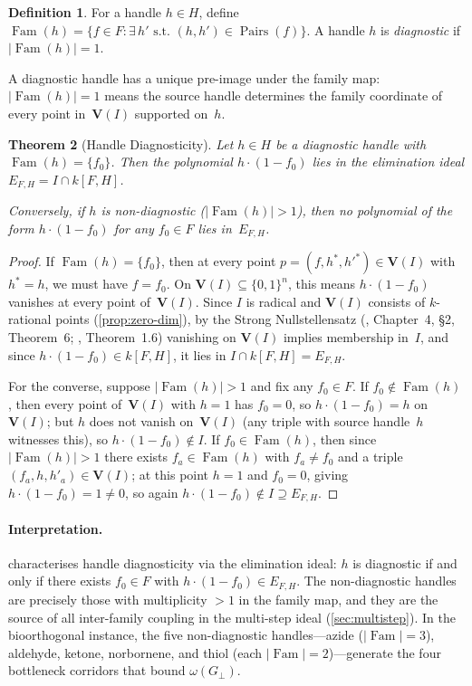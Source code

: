 \documentclass[preprint,12pt]{elsarticle}
\newtheorem{theorem}{Theorem}[section]
\theoremstyle{definition}
\newtheorem{definition}[theorem]{Definition}
\theoremstyle{remark}
\newcommand{\kk}{k}
\newcommand{\Var}{\mathbf{V}}
\DeclareMathOperator{\Fam}{Fam}
\DeclareMathOperator{\Pairs}{Pairs}
\begin{document}
\begin{definition}\label{def:diagnostic}
For a handle $h \in H$, define
$\Fam(h) = \{f \in F : \exists\, h' \text{ s.t.\ }
(h, h') \in \Pairs(f)\}$.
A handle $h$ is \emph{diagnostic} if $|\Fam(h)| = 1$.
\end{definition}

A diagnostic handle has a unique pre-image under the family
map: $|\Fam(h)| = 1$ means the source handle determines the
family coordinate of every point in~$\Var(I)$ supported on~$h$.

\begin{theorem}[Handle Diagnosticity]\label{thm:diagnostic}
Let $h \in H$ be a diagnostic handle with $\Fam(h) = \{f_0\}$.
Then the polynomial $h \cdot (1 - f_0)$ lies in the elimination
ideal $E_{F,H} = I \cap \kk[F, H]$.

Conversely, if $h$ is non-diagnostic ($|\Fam(h)| > 1$), then
no polynomial of the form $h \cdot (1 - f_0)$ for any $f_0 \in F$
lies in~$E_{F,H}$.
\end{theorem}

\begin{proof}
If $\Fam(h) = \{f_0\}$, then at every point
$p = (f, h^*, h'^*) \in \Var(I)$ with $h^* = h$, we must have
$f = f_0$.  On $\Var(I) \subseteq \{0,1\}^n$, this means
$h \cdot (1 - f_0)$ vanishes at every point of~$\Var(I)$.
Since $I$ is radical and $\Var(I)$ consists of $\kk$-rational
points (\cref{prop:zero-dim}), by the Strong Nullstellensatz
(\cite{CLO15}, Chapter~4, \S2, Theorem~6;
\cite{Eisenbud95}, Theorem~1.6) vanishing on $\Var(I)$ implies membership
in~$I$, and since $h \cdot (1 - f_0) \in \kk[F, H]$, it
lies in $I \cap \kk[F, H] = E_{F,H}$.

For the converse, suppose $|\Fam(h)| > 1$ and fix any
$f_0 \in F$.  If $f_0 \notin \Fam(h)$, then every point
of~$\Var(I)$ with $h = 1$ has $f_0 = 0$, so
$h \cdot (1 - f_0) = h$ on $\Var(I)$; but $h$ does not vanish
on~$\Var(I)$ (any triple with source handle~$h$ witnesses this),
so $h \cdot (1 - f_0) \notin I$.  If $f_0 \in \Fam(h)$, then
since $|\Fam(h)| > 1$ there exists $f_a \in \Fam(h)$ with
$f_a \neq f_0$ and a triple $(f_a, h, h'_a) \in \Var(I)$;
at this point $h = 1$ and $f_0 = 0$, giving
$h \cdot (1 - f_0) = 1 \neq 0$, so again
$h \cdot (1 - f_0) \notin I \supseteq E_{F,H}$.
\end{proof}

\paragraph{Interpretation.}
 characterises handle diagnosticity via the
elimination ideal: $h$ is diagnostic if and only if there exists
$f_0 \in F$ with $h \cdot (1 - f_0) \in E_{F,H}$.
The non-diagnostic handles are precisely those with multiplicity $> 1$
in the family map, and they are the source of all inter-family coupling
in the multi-step ideal (\cref{sec:multistep}).  In the bioorthogonal
instance, the five non-diagnostic handles---azide ($|\Fam| = 3$),
aldehyde, ketone, norbornene, and thiol (each $|\Fam| = 2$)---generate
the four bottleneck corridors that bound $\omega(G_\perp)$.
\end{document}
